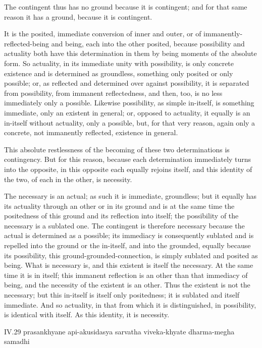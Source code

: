 The contingent thus has no ground because it is contingent;
and for that same reason it has a ground, because it is contingent.

It is the posited, immediate conversion of inner and outer,
or of immanently-reflected-being and being,
each into the other posited,
because possibility and actuality
both have this determination in them
by being moments of the absolute form.
So actuality, in its immediate unity with possibility,
is only concrete existence and is determined as groundless,
something only posited or only possible;
or, as reflected and determined over against possibility,
it is separated from possibility,
from immanent reflectedness,
and then, too, is no less
immediately only a possible.
Likewise possibility, as simple in-itself,
is something immediate,
only an existent in general;
or, opposed to actuality,
it equally is an in-itself
without actuality, only a possible,
but, for that very reason,
again only a concrete,
not immanently reflected,
existence in general.

This absolute restlessness of the becoming of
these two determinations is contingency.
But for this reason, because each determination
immediately turns into the opposite,
in this opposite each equally rejoins itself,
and this identity of the two,
of each in the other,
is necessity.

The necessary is an actual;
as such it is immediate, groundless;
but it equally has its actuality
through an other or in its ground
and is at the same time the positedness of this ground
and its reflection into itself;
the possibility of the necessary is a sublated one.
The contingent is therefore necessary
because the actual is determined as a possible;
its immediacy is consequently sublated
and is repelled into the ground or the in-itself,
and into the grounded, equally because its possibility,
this ground-grounded-connection,
is simply sublated and posited as being.
What is necessary is,
and this existent is itself the necessary.
At the same time it is in itself;
this immanent reflection is an other than that immediacy of being,
and the necessity of the existent is an other.
Thus the existent is not the necessary;
but this in-itself is itself only positedness;
it is sublated and itself immediate.
And so actuality, in that from which it is distinguished,
in possibility, is identical with itself.
As this identity, it is necessity.

IV.29
prasankhyane api-akusidasya sarvatha viveka-khyate dharma-megha samadhi

